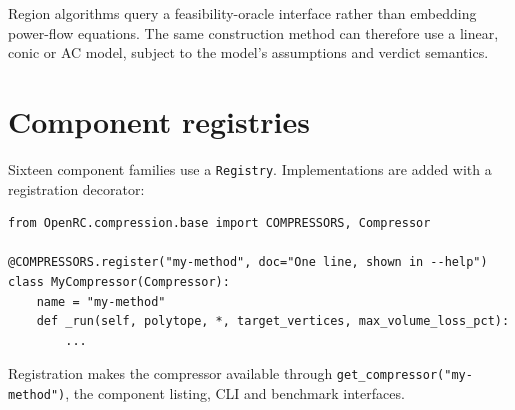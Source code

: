 \documentclass[11pt,a4paper]{report}
\newcommand{\code}[1]{\texttt{\small #1}}
\begin{document}
Region algorithms query a feasibility-oracle interface rather than embedding
power-flow equations. The same construction method can therefore use a linear,
conic or AC model, subject to the model's assumptions and verdict semantics.

\section{Component registries}

Sixteen component families use a \code{Registry}. Implementations are added
with a registration decorator:

\begin{lstlisting}
from OpenRC.compression.base import COMPRESSORS, Compressor

@COMPRESSORS.register("my-method", doc="One line, shown in --help")
class MyCompressor(Compressor):
    name = "my-method"
    def _run(self, polytope, *, target_vertices, max_volume_loss_pct):
        ...
\end{lstlisting}

Registration makes the compressor available through
\code{get\_compressor("my-method")}, the component listing, CLI and benchmark
interfaces.
\end{document}
